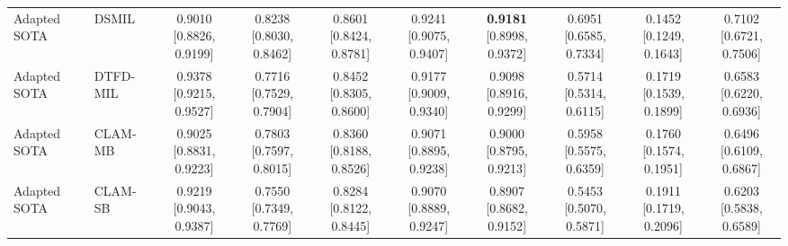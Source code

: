 \documentclass[Afour,sagev,times]{sagej}
\begin{document}
\begin{table}[t]
{\begin{tabular}{ll*{8}{c}}
Adapted SOTA & DSMIL & \shortstack{0.9010\\{[}0.8826, 0.9199{]}} & \shortstack{0.8238\\{[}0.8030, 0.8462{]}} & \shortstack{0.8601\\{[}0.8424, 0.8781{]}} & \shortstack{0.9241\\{[}0.9075, 0.9407{]}} & \shortstack{\textbf{0.9181}\\{[}0.8998, 0.9372{]}} & \shortstack{0.6951\\{[}0.6585, 0.7334{]}} & \shortstack{0.1452\\{[}0.1249, 0.1643{]}} & \shortstack{0.7102\\{[}0.6721, 0.7506{]}} \\
Adapted SOTA & DTFD-MIL & \shortstack{0.9378\\{[}0.9215, 0.9527{]}} & \shortstack{0.7716\\{[}0.7529, 0.7904{]}} & \shortstack{0.8452\\{[}0.8305, 0.8600{]}} & \shortstack{0.9177\\{[}0.9009, 0.9340{]}} & \shortstack{0.9098\\{[}0.8916, 0.9299{]}} & \shortstack{0.5714\\{[}0.5314, 0.6115{]}} & \shortstack{0.1719\\{[}0.1539, 0.1899{]}} & \shortstack{0.6583\\{[}0.6220, 0.6936{]}} \\
Adapted SOTA & CLAM-MB & \shortstack{0.9025\\{[}0.8831, 0.9223{]}} & \shortstack{0.7803\\{[}0.7597, 0.8015{]}} & \shortstack{0.8360\\{[}0.8188, 0.8526{]}} & \shortstack{0.9071\\{[}0.8895, 0.9238{]}} & \shortstack{0.9000\\{[}0.8795, 0.9213{]}} & \shortstack{0.5958\\{[}0.5575, 0.6359{]}} & \shortstack{0.1760\\{[}0.1574, 0.1951{]}} & \shortstack{0.6496\\{[}0.6109, 0.6867{]}} \\
Adapted SOTA & CLAM-SB & \shortstack{0.9219\\{[}0.9043, 0.9387{]}} & \shortstack{0.7550\\{[}0.7349, 0.7769{]}} & \shortstack{0.8284\\{[}0.8122, 0.8445{]}} & \shortstack{0.9070\\{[}0.8889, 0.9247{]}} & \shortstack{0.8907\\{[}0.8682, 0.9152{]}} & \shortstack{0.5453\\{[}0.5070, 0.5871{]}} & \shortstack{0.1911\\{[}0.1719, 0.2096{]}} & \shortstack{0.6203\\{[}0.5838, 0.6589{]}} \\
\bottomrule
\end{tabular}
}
\end{table}
\end{document}
